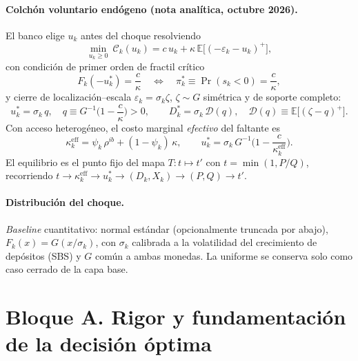 \documentclass[11pt]{article}
\newcommand{\E}{\mathbb{E}}
\newcommand{\keff}{\kappa^{\mathrm{eff}}}
\theoremstyle{definition}
\begin{document}
\paragraph{Colch\'on voluntario end\'ogeno (nota anal\'itica, octubre 2026).}
El banco elige $u_k$ antes del choque resolviendo
\begin{equation}
\min_{u_k\ge 0}\ \mathcal{C}_k(u_k)= c\,u_k+\kappa\,\E\big[(-\varepsilon_k-u_k)^+\big],
\label{eq:newsvendor}
\end{equation}
con condici\'on de primer orden de fractil cr\'itico
\begin{equation}
F_k(-u^*_k)=\frac{c}{\kappa}
\quad\Longleftrightarrow\quad
\pi^*_k\equiv\Pr(s_k<0)=\frac{c}{\kappa},
\label{eq:cpo}
\end{equation}
y cierre de localizaci\'on--escala $\varepsilon_k=\sigma_k\zeta$, $\zeta\sim G$
sim\'etrica y de soporte completo:
\begin{equation}
u^*_k=\sigma_k\,q,\quad q\equiv G^{-1}\!\Big(1-\frac{c}{\kappa}\Big)>0,
\qquad D^*_k=\sigma_k\,\mathcal{D}(q),\quad
\mathcal{D}(q)\equiv\E\big[(\zeta-q)^+\big].
\label{eq:locscale}
\end{equation}
Con acceso heterog\'eneo, el costo marginal \emph{efectivo} del faltante es
\begin{equation}
\keff_k=\psi_k\,\rho^{ib}+(1-\psi_k)\,\kappa,
\qquad
u^*_k=\sigma_k\,G^{-1}\!\Big(1-\frac{c}{\keff_k}\Big).
\label{eq:kappaeff}
\end{equation}
El equilibrio es el punto fijo del mapa $T:t\mapsto t'$ con
$t=\min(1,P/Q)$, recorriendo
$t\to\keff_k\to u^*_k\to (D_k,X_k)\to (P,Q)\to t'$.

\paragraph{Distribuci\'on del choque.} \emph{Baseline} cuantitativo: normal
est\'andar (opcionalmente truncada por abajo), $F_k(x)=G(x/\sigma_k)$, con
$\sigma_k$ calibrada a la volatilidad del crecimiento de dep\'ositos (SBS) y
$G$ com\'un a ambas monedas. La uniforme se conserva solo como caso cerrado de
la capa base.

\section{Bloque A. Rigor y fundamentaci\'on de la decisi\'on \'optima}
\end{document}
